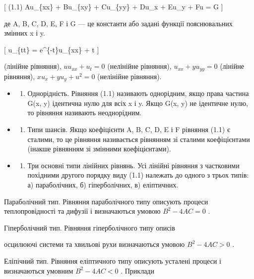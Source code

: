 \documentclass[
  ukrainian,
]{article}
\providecommand{\tightlist}{%
  \setlength{\itemsep}{0pt}\setlength{\parskip}{0pt}}
\begin{document}
{[} (1.1) Au\_\{xx\} + Bu\_\{xy\} + Cu\_\{yy\} + Du\_x + Eu\_y + Fu = G
{]}

де A, B, C, D, E, F і G --- це константи або задані функції
пояснювальних змінних x і y.

{[} u\_\{tt\} = e\^{}\{-t\}u\_\{xx\} + \sin t {]}

(лінійне рівняння), \(uu_{xx} + u_t = 0\) (нелінійне рівняння),
\(u_{xx} + yu_{yy} = 0\) (лінійне рівняння), \(xu_x + yu_y + u^2 = 0\)
(нелінійне рівняння).

\begin{itemize}
\tightlist
\item
  \begin{enumerate}
  \def\labelenumi{\arabic{enumi}.}
  \setcounter{enumi}{3}
  \tightlist
  \item
    Однорідність. Рівняння (1.1) називають однорідним, якщо права
    частина G(x, y) ідентична нулю для всіх x і y. Якщо G(x, y) не
    ідентичне нулю, то рівняння називають неоднорідним.
  \end{enumerate}
\item
  \begin{enumerate}
  \def\labelenumi{\arabic{enumi}.}
  \setcounter{enumi}{4}
  \tightlist
  \item
    Типи шансів. Якщо коефіцієнти A, B, C, D, E і F рівняння (1.1) є
    сталими, то це рівняння називається рівнянням зі сталими
    коефіцієнтами (інакше рівнянням зі змінними коефіцієнтами).
  \end{enumerate}
\item
  \begin{enumerate}
  \def\labelenumi{\arabic{enumi}.}
  \setcounter{enumi}{5}
  \tightlist
  \item
    Три основні типи лінійних рівнянь. Усі лінійні рівняння з частковими
    похідними другого порядку виду (1.1) належать до одного з трьох
    типів: а) параболічних, б) гіперболічних, в) еліптичних.
  \end{enumerate}
\end{itemize}

Параболічний тип. Рівняння параболічного типу описують процеси
теплопровідності та дифузії і визначаються умовою \(B^2 - 4AC = 0\) .

Гіперболічний тип. Рівняння гіперболічного типу описів

осцилюючі системи та хвильові рухи визначаються умовою \(B^2-4AC>0\) .

Еліпічний тип. Рівняння еліптичного типу описують усталені процеси і
визначаються умовним \(B^2-4AC<0\) . Приклади
\end{document}
